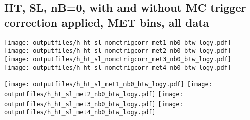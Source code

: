 \documentclass[11pt]{article}
\begin{document}
   \clearpage
     \subsection{ HT, SL, nB=0, with and without MC trigger correction applied, MET bins, all data}

    \noindent
     \texttt{[image: outputfiles/h\_ht\_sl\_nomctrigcorr\_met1\_nb0\_btw\_logy.pdf]}
     \texttt{[image: outputfiles/h\_ht\_sl\_nomctrigcorr\_met2\_nb0\_btw\_logy.pdf]}
     \texttt{[image: outputfiles/h\_ht\_sl\_nomctrigcorr\_met3\_nb0\_btw\_logy.pdf]}
     \texttt{[image: outputfiles/h\_ht\_sl\_nomctrigcorr\_met4\_nb0\_btw\_logy.pdf]}

    \noindent
     \texttt{[image: outputfiles/h\_ht\_sl\_met1\_nb0\_btw\_logy.pdf]}
     \texttt{[image: outputfiles/h\_ht\_sl\_met2\_nb0\_btw\_logy.pdf]}
     \texttt{[image: outputfiles/h\_ht\_sl\_met3\_nb0\_btw\_logy.pdf]}
     \texttt{[image: outputfiles/h\_ht\_sl\_met4\_nb0\_btw\_logy.pdf]}

   \clearpage









\end{document}
